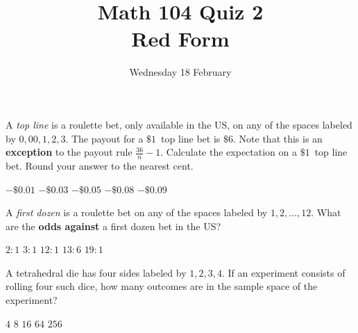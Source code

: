 \documentclass[answers,12pt]{exam}
\title{Math 104 Quiz 2\\Red Form}
\date{Wednesday 18 February}
\begin{document}
\maketitle
\thispagestyle{empty}
\begin{center}
\end{center}

\begin{questions}
\question A {\em top line} is a roulette bet,
only available in the US, on any of the spaces labeled by
$0,00,1,2,3$. The payout for a $\$1$~top line bet
is $\$6$.
Note that this is an {\bf exception} to the
payout rule $\frac{36}{n}-1$.
Calculate the expectation on a $\$1$~top line bet.
Round your answer to the nearest cent.\\
\begin{oneparchoices}
\choice $-\$0.01$
\choice $-\$0.03$ %
\choice $-\$0.05$ %
\correctchoice $-\$0.08$
\choice $-\$0.09$
\end{oneparchoices}

\question A {\em first dozen} is a roulette bet
on any of the spaces labeled by $1,2,\ldots,12$. What are the
{\bf odds against} a first dozen bet in the US?\\
\begin{oneparchoices}
\choice $2:1$ %
\choice $3:1$ %
\choice $12:1$ %
\correctchoice $13:6$
\choice $19:1$ %
\end{oneparchoices}

\question A tetrahedral die has four sides labeled
by $1,2,3,4$.
If an experiment consists of rolling four such dice, how
many outcomes are in the sample space of the experiment?\\
\begin{oneparchoices}
\choice $4$ %
\choice $8$
\choice $16$ %
\choice $64$ %
\correctchoice $256$
\end{oneparchoices}



\end{questions}
\end{document}
